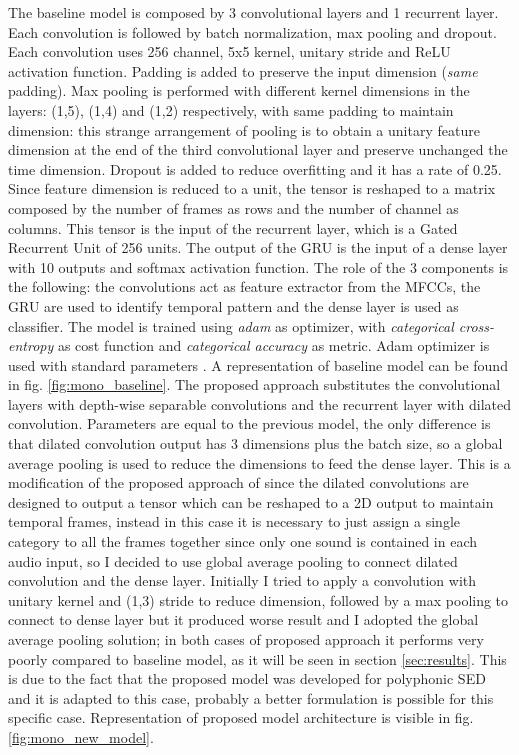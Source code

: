 \documentclass{article}
\begin{document}
The baseline model is composed by 3 convolutional layers and 1 recurrent layer. Each convolution is followed by batch normalization, max pooling and dropout. Each convolution uses 256 channel, 5x5 kernel, unitary stride and ReLU activation function. Padding is added to preserve the input dimension (\textit{same} padding). Max pooling is performed with different kernel dimensions in the layers: (1,5), (1,4) and (1,2) respectively, with same padding to maintain dimension: this strange arrangement of pooling is to obtain a unitary feature dimension at the end of the third convolutional layer and preserve unchanged the time dimension. Dropout is added to reduce overfitting and it has a rate of 0.25. Since feature dimension is reduced to a unit, the tensor is reshaped to a matrix composed by the number of frames as rows and the number of channel as columns. This tensor is the input of the recurrent layer, which is a Gated Recurrent Unit of 256 units. The output of the GRU is the input of a dense layer with 10 outputs and softmax activation function. The role of the 3 components is the following: the convolutions act as feature extractor from the MFCCs, the GRU are used to identify temporal pattern and the dense layer is used as classifier. The model is trained using \textit{adam} as optimizer, with \textit{categorical cross-entropy} as cost function and \textit{categorical accuracy} as metric. Adam optimizer is used with standard parameters \cite{kingma2017adam}. A representation of baseline model can be found in fig. \ref{fig:mono_baseline}.\newline
The proposed approach substitutes the convolutional layers with depth-wise separable convolutions and the recurrent layer with dilated convolution. Parameters are equal to the previous model, the only difference is that dilated convolution output has 3 dimensions plus the batch size, so a global average pooling is used to reduce the dimensions to feed the dense layer. This is a modification of the proposed approach of \cite{drossos2020sound} since the dilated convolutions are designed to output a tensor which can be reshaped to a 2D output to maintain temporal frames, instead in this case it is necessary to just assign a single category to all the frames together since only one sound is contained in each audio input, so I decided to use global average pooling to connect dilated convolution and the dense layer. Initially I tried to apply a convolution with unitary kernel and (1,3) stride to reduce dimension, followed by a max pooling to connect to dense layer but it produced worse result and I adopted the global average pooling solution; in both cases of proposed approach it performs very poorly compared to baseline model, as it will be seen in section \ref{sec:results}. This is due to the fact that the proposed model was developed for polyphonic SED and it is adapted to this case, probably a better formulation is possible for this specific case. Representation of proposed model architecture is visible in fig. \ref{fig:mono_new_model}.
\end{document}
